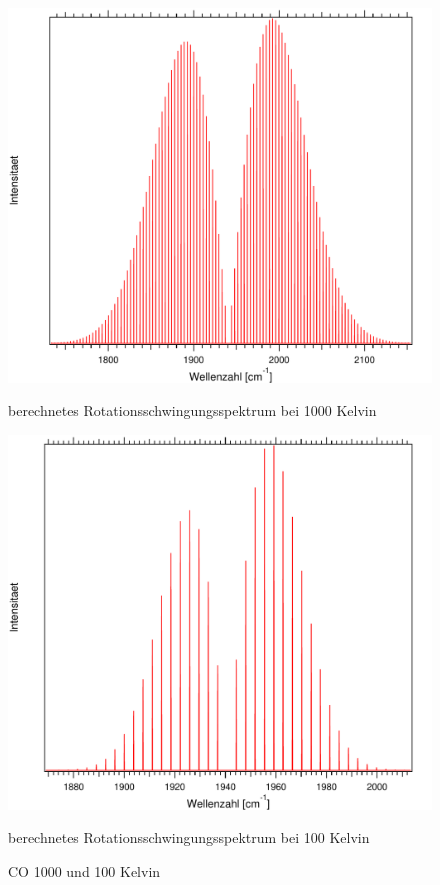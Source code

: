 \begin{figure}[ht]
	
	\begin{minipage}{0.5\textwidth}
	\includegraphics[width=\textwidth]{Bilder/1000CO.pdf}
	\caption{berechnetes Rotationsschwingungsspektrum bei 1000 Kelvin}
	\end{minipage}
\begin{minipage}{0.5\textwidth}
	\includegraphics[width=\textwidth]{Bilder/100CO.pdf}
	\caption{berechnetes Rotationsschwingungsspektrum bei 100 Kelvin}
	\end{minipage}	
	
	\caption{CO 1000 und 100 Kelvin}
	
	
\end{figure}

